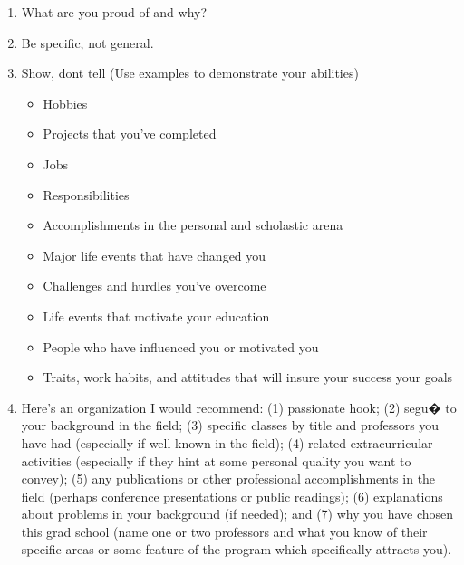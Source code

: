 \documentclass[a4paper,12pt]{article}%
\begin{document}
\begin{enumerate}
	  \hrulefill
	  
	  \hrulefill
	  
\item What are you proud of and why?
\item 	Be specific, not general.
\item Show, dont tell (Use examples to demonstrate your abilities)
\begin{itemize}
	\item Hobbies 
	\item Projects that you've completed
	\item Jobs
	\item Responsibilities
	\item Accomplishments in the personal and scholastic arena
	\item Major life events that have changed you
	\item Challenges and hurdles you've overcome
	\item Life events that motivate your education
	\item People who have influenced you or motivated you 
	\item Traits, work habits, and attitudes that will insure your success your goals
\end{itemize}

	  \hrulefill
	  
	  \hrulefill

\item   Here's an organization I would recommend: (1) passionate hook; (2) segu� to your background in the field; (3) specific classes by title and professors you have had (especially if well-known in the field); (4) related extracurricular activities (especially if they hint at some personal quality you want to convey); (5) any publications or other professional accomplishments in the field (perhaps conference presentations or public readings); (6) explanations about problems in your background (if needed); and (7) why you have chosen this grad school (name one or two professors and what you know of their specific areas or some feature of the program which specifically attracts you).
	\end{enumerate}		
	  \hrulefill
	  
	  \hrulefill 
	  
	  \hrulefill
\end{document}
